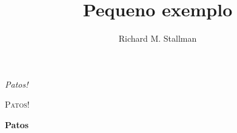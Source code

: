 \documentclass[12pt, a4paper]{article}
\title{Pequeno exemplo}
\author{Richard M. Stallman}
\begin{document}
  \maketitle

  \begin{flushright}
    \huge \textit{Patos!}
  \end{flushright}
  \bigskip

  {\small \textsc{Patos!}}
  \pagebreak

  \begin{center}
    \Huge \textbf{Patos}
  \end{center}
\end{document}
